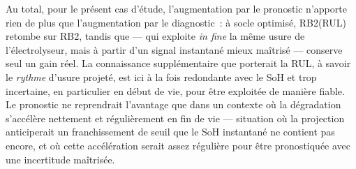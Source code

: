 Au total, pour le présent cas d'étude, l'augmentation par le pronostic n'apporte rien de plus que l'augmentation par le diagnostic~: à socle optimisé, RB2(RUL) retombe sur RB2, tandis que \RBsohH{} — qui exploite \emph{in fine} la même usure de l'électrolyseur, mais à partir d'un signal instantané mieux maîtrisé — conserve seul un gain réel. La connaissance supplémentaire que porterait la RUL, à savoir le \emph{rythme} d'usure projeté, est ici à la fois redondante avec le SoH et trop incertaine, en particulier en début de vie, pour être exploitée de manière fiable. Le pronostic ne reprendrait l'avantage que dans un contexte où la dégradation s'accélère nettement et régulièrement en fin de vie — situation où la projection anticiperait un franchissement de seuil que le SoH instantané ne contient pas encore, et où cette accélération serait assez régulière pour être pronostiquée avec une incertitude maîtrisée.
